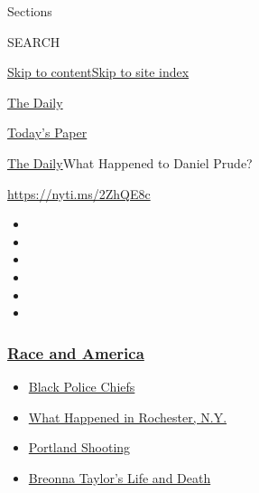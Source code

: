 Sections

SEARCH

\protect\hyperlink{site-content}{Skip to
content}\protect\hyperlink{site-index}{Skip to site index}

\href{https://www.nytimes3xbfgragh.onion/podcasts/the-daily}{The Daily}

\href{https://myaccount.nytimes3xbfgragh.onion/auth/login?response_type=cookie\&client_id=vi}{}

\href{https://www.nytimes3xbfgragh.onion/section/todayspaper}{Today's
Paper}

\href{/podcasts/the-daily}{The Daily}\textbar{}What Happened to Daniel
Prude?

\url{https://nyti.ms/2ZhQE8c}

\begin{itemize}
\item
\item
\item
\item
\item
\item
\end{itemize}

\hypertarget{race-and-america}{%
\subsubsection{\texorpdfstring{\href{https://www.nytimes3xbfgragh.onion/news-event/george-floyd-protests-minneapolis-new-york-los-angeles?name=styln-george-floyd\&region=TOP_BANNER\&block=storyline_menu_recirc\&action=click\&pgtype=Article\&impression_id=21c69380-f4c8-11ea-be21-1dfd0b108786\&variant=undefined}{Race
and America}}{Race and America}}\label{race-and-america}}

\begin{itemize}
\tightlist
\item
  \href{https://www.nytimes3xbfgragh.onion/2020/09/11/us/black-police-chiefs-reform.html?name=styln-george-floyd\&region=TOP_BANNER\&block=storyline_menu_recirc\&action=click\&pgtype=Article\&impression_id=21c69381-f4c8-11ea-be21-1dfd0b108786\&variant=undefined}{Black
  Police Chiefs}
\item
  \href{https://www.nytimes3xbfgragh.onion/2020/09/04/nyregion/rochester-police-daniel-prude.html?name=styln-george-floyd\&region=TOP_BANNER\&block=storyline_menu_recirc\&action=click\&pgtype=Article\&impression_id=21c69382-f4c8-11ea-be21-1dfd0b108786\&variant=undefined}{What
  Happened in Rochester, N.Y.}
\item
  \href{https://www.nytimes3xbfgragh.onion/2020/08/30/us/portland-shooting-explained.html?name=styln-george-floyd\&region=TOP_BANNER\&block=storyline_menu_recirc\&action=click\&pgtype=Article\&impression_id=21c69383-f4c8-11ea-be21-1dfd0b108786\&variant=undefined}{Portland
  Shooting}
\item
  \href{https://www.nytimes3xbfgragh.onion/2020/08/30/us/breonna-taylor-police-killing.html?name=styln-george-floyd\&region=TOP_BANNER\&block=storyline_menu_recirc\&action=click\&pgtype=Article\&impression_id=21c69384-f4c8-11ea-be21-1dfd0b108786\&variant=undefined}{Breonna
  Taylor's Life and Death}
\end{itemize}

